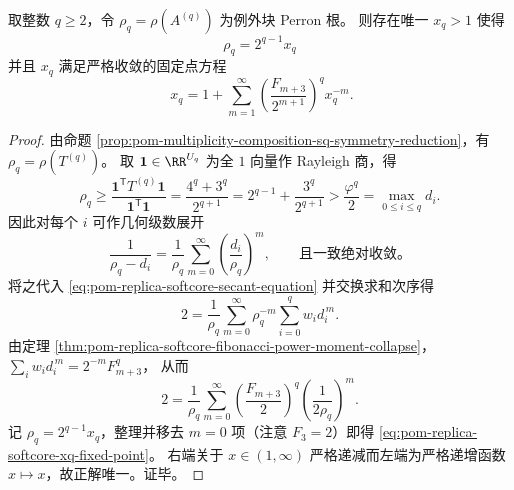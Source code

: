 \begin{theorem}\label{thm:pom-replica-softcore-perron-fibonacci-fixed-point}
取整数 \(q\ge 2\)，令 \(\rho_q=\rho(A^{(q)})\) 为例外块 Perron 根。
则存在唯一 \(x_q>1\) 使得
\begin{equation}\label{eq:pom-replica-softcore-rho-xq}
\boxed{\;\rho_q=2^{q-1}x_q\;}
\end{equation}
并且 \(x_q\) 满足严格收敛的固定点方程
\begin{equation}\label{eq:pom-replica-softcore-xq-fixed-point}
\boxed{\;
x_q
=1+\sum_{m=1}^{\infty}\left(\frac{F_{m+3}}{2^{m+1}}\right)^{q}x_q^{-m}.}
\end{equation}
\end{theorem}
\begin{proof}
由命题 \ref{prop:pom-multiplicity-composition-sq-symmetry-reduction}，有 \(\rho_q=\rho(T^{(q)})\)。
取 \(\mathbf{1}\in\RR^{U_q}\) 为全 \(1\) 向量作 Rayleigh 商，得
\[
\rho_q
\ge \frac{\mathbf 1^{\mathsf T}T^{(q)}\mathbf 1}{\mathbf 1^{\mathsf T}\mathbf 1}
=\frac{4^q+3^q}{2^{q+1}}
=2^{q-1}+\frac{3^q}{2^{q+1}}
>\frac{\varphi^q}{2}
=\max_{0\le i\le q} d_i.
\]
因此对每个 \(i\) 可作几何级数展开
\[
\frac{1}{\rho_q-d_i}=\frac{1}{\rho_q}\sum_{m=0}^{\infty}\left(\frac{d_i}{\rho_q}\right)^{m},
\qquad \text{且一致绝对收敛。}
\]
将之代入 \eqref{eq:pom-replica-softcore-secant-equation} 并交换求和次序得
\[
2=\frac{1}{\rho_q}\sum_{m=0}^{\infty}\rho_q^{-m}\sum_{i=0}^{q}w_i d_i^{\,m}.
\]
由定理 \ref{thm:pom-replica-softcore-fibonacci-power-moment-collapse}，
\(
\sum_i w_i d_i^{\,m}=2^{-m}F_{m+3}^q
\)，
从而
\[
2=\frac{1}{\rho_q}\sum_{m=0}^{\infty}\left(\frac{F_{m+3}}{2}\right)^{q}\left(\frac{1}{2\rho_q}\right)^m.
\]
记 \(\rho_q=2^{q-1}x_q\)，整理并移去 \(m=0\) 项（注意 \(F_3=2\)）即得 \eqref{eq:pom-replica-softcore-xq-fixed-point}。
右端关于 \(x\in(1,\infty)\) 严格递减而左端为严格递增函数 \(x\mapsto x\)，故正解唯一。证毕。
\end{proof}

